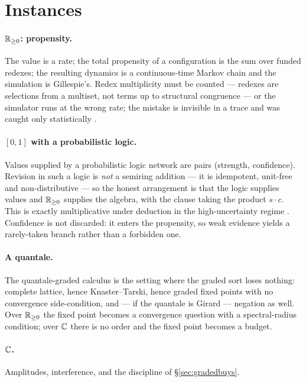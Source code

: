 \section{Instances}
\label{sec:instances4}

\paragraph{$\mathbb{R}_{\ge0}$: propensity.} The value is a rate; the total propensity of
a configuration is the sum over funded redexes; the resulting dynamics is a
continuous-time Markov chain and the simulation is Gillespie's. Redex multiplicity
must be counted --- redexes are selections from a multiset, not terms up to
structural congruence --- or the simulator runs at the wrong rate; the mistake is
invisible in a trace and was caught only statistically \cite{WeightedGSLT}.

\paragraph{$[0,1]$ with a probabilistic logic.} Values supplied by a probabilistic
logic network are pairs (strength, confidence). Revision in such a logic is
\emph{not} a semiring addition --- it is idempotent, unit-free and
non-distributive --- so the honest arrangement is that the logic supplies values
and $\mathbb{R}_{\ge0}$ supplies the algebra, with the clause taking the product
$s \cdot c$. This is exactly multiplicative under deduction in the
high-uncertainty regime \cite{Goertzel24}. Confidence is not discarded: it enters
the propensity, so weak evidence yields a rarely-taken branch rather than a
forbidden one.

\paragraph{A quantale.} The quantale-graded calculus \cite{FuzzyRho} is the
setting where the graded sort loses nothing: complete lattice, hence
Knaster--Tarski, hence graded fixed points with no convergence side-condition, and
--- if the quantale is Girard --- negation as well. Over $\mathbb{R}_{\ge0}$ the fixed
point becomes a convergence question with a spectral-radius condition; over $\mathbb{C}$
there is no order and the fixed point becomes a budget.

\paragraph{$\mathbb{C}$.} Amplitudes, interference, and the discipline of
\S\ref{sec:gradedbuys}.

